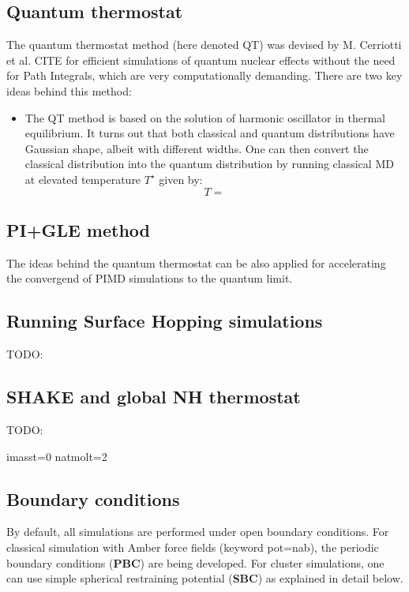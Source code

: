\subsection{Quantum thermostat}
The quantum thermostat method (here denoted QT) was devised by M. Cerriotti et al. CITE for efficient simulations of quantum nuclear effects without the need for Path Integrals, which are very computationally demanding. There are two key ideas behind this method:

\begin{itemize}
\item The QT method is based on the solution of harmonic oscillator in thermal equilibrium. 
It turns out that both classical and quantum distributions have Gaussian shape, albeit with different widths. One can then convert the classical distribution into the quantum distribution
by running classical MD at elevated temperature $T^{\star}$ given by:
\begin{equation}
T =  
\end{equation}
\end{itemize}

\subsection{PI+GLE method}
The ideas behind the quantum thermostat can be also applied for accelerating the convergend of PIMD simulations to the quantum limit.  


\subsection{Running Surface Hopping simulations}
TODO:



\subsection{SHAKE and global NH thermostat}
TODO:

\label{sec:shake}

\colorbox{black!20}{imasst=0 } %
\colorbox{black!20}{natmolt=2 } %


\subsection{Boundary conditions}
By default, all simulations are performed under open boundary conditions.
For classical simulation with Amber force fields (keyword pot=nab), the periodic boundary conditions (\textbf{PBC}) are being developed.
For cluster simulations, one can use simple spherical restraining potential (\textbf{SBC}) as explained in detail below. 

